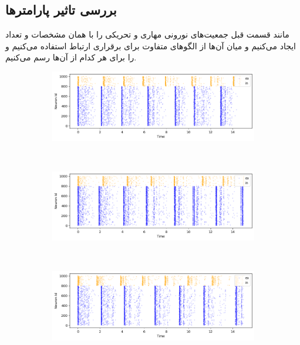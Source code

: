 \documentclass[12pt]{article}
\begin{document}
	\subsection{ بررسی تاثیر پارامتر‌ها}
مانند قسمت قبل جمعیت‌های نورونی مهاری و تحریکی را با همان مشخصات و تعداد ایجاد می‌کنیم و میان آن‌ها از الگو‌های متفاوت برای برقراری ارتباط استفاده ‌می‌کنیم و  را برای هر کدام از آن‌ها رسم می‌کنیم.


\begin{figure}[H]
\centering
  \begin{subfigure}[b]{0.8\textwidth}
    \includegraphics[width=\textwidth]{Figs/raster-f.png}
    \caption{}
  \end{subfigure}
  \\[\smallskipamount]
  \begin{subfigure}[b]{0.8\textwidth}
    \includegraphics[width=\textwidth]{Figs/raster-prob.png}
    \caption{}
  \end{subfigure}
  \\[\smallskipamount]
  \begin{subfigure}[b]{0.8\textwidth}
    \includegraphics[width=\textwidth]{Figs/raster-count.png}
    \caption{}
  \end{subfigure}
  \caption{}
  \label{Fig:f-p-c}
\end{figure}
\end{document}
